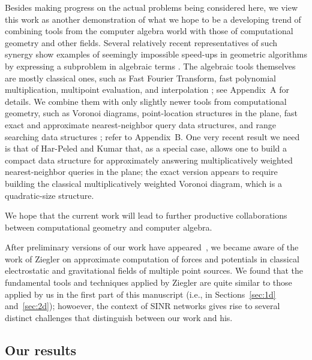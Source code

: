 \documentclass[11pt]{article}
\theoremstyle{remark}
\begin{document}
Besides making progress on the actual problems being considered here, we view this work as another demonstration of what we hope to be a developing trend of combining tools from the computer algebra world with those of computational geometry and other fields.  Several relatively recent representatives of such synergy show examples of seemingly impossible speed-ups in geometric algorithms by expressing a subproblem in algebraic terms \cite{ma-cdplbf-16,ma-cdplbf-12,arst-ccvarp-07}.  The algebraic tools themselves are mostly classical ones, such as Fast Fourier Transform, fast polynomial multiplication, multipoint evaluation, and interpolation \cite{gg-mca-99,bp-pmcfa-94}; see Appendix~A for details. We combine them with only slightly newer tools from computational geometry, such as Voronoi diagrams, point-location structures in the plane, fast exact and approximate nearest-neighbor query data structures, and range searching data structures \cite{bcko-cgaa-08}; refer to Appendix~B.  One very recent result we need is that of Har-Peled and Kumar \cite{wann} that, as a special case, allows one to build a compact data structure for approximately answering multiplicatively weighted nearest-neighbor queries in the plane; the exact version appears to require building the classical multiplicatively weighted Voronoi diagram, which is a quadratic-size structure.

We hope that the current work will lead to further productive collaborations between computational geometry and computer algebra.

After preliminary versions of our work have appeared~\cite{ak-bpsdat-15,this-arXiv}, we became aware of the work of Ziegler \cite{Ziegler03} on approximate computation of forces and potentials in classical electrostatic and gravitational fields of multiple point sources. We found that the fundamental tools and techniques applied by Ziegler are quite similar to those applied by us in the first part of this manuscript (i.e., in Sections~\ref{sec:1d} and~\ref{sec:2d}); howoever, the context of SINR networks gives rise to several distinct challenges that distinguish between our work and his.







\subsection{Our results}
\label{sec:results}
\end{document}
